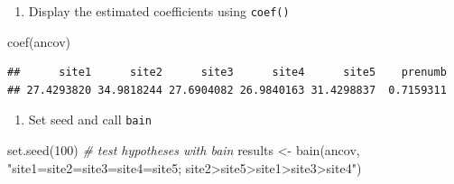 \documentclass[
]{book}
\newenvironment{Shaded}{\begin{snugshade}}{\end{snugshade}}
\newcommand{\CommentTok}[1]{\textcolor[rgb]{0.56,0.35,0.01}{\textit{#1}}}
\newcommand{\DecValTok}[1]{\textcolor[rgb]{0.00,0.00,0.81}{#1}}
\newcommand{\FunctionTok}[1]{\textcolor[rgb]{0.00,0.00,0.00}{#1}}
\newcommand{\NormalTok}[1]{#1}
\newcommand{\OtherTok}[1]{\textcolor[rgb]{0.56,0.35,0.01}{#1}}
\newcommand{\SpecialCharTok}[1]{\textcolor[rgb]{0.00,0.00,0.00}{#1}}
\newcommand{\StringTok}[1]{\textcolor[rgb]{0.31,0.60,0.02}{#1}}
\providecommand{\tightlist}{%
  \setlength{\itemsep}{0pt}\setlength{\parskip}{0pt}}
\begin{document}
\begin{Shaded}
\end{Shaded}

\begin{enumerate}
\def\labelenumi{\arabic{enumi})}
\setcounter{enumi}{1}
\tightlist
\item
  Display the estimated coefficients using \texttt{coef()}
\end{enumerate}

\begin{Shaded}
\begin{Highlighting}[]
\FunctionTok{coef}\NormalTok{(ancov)}
\end{Highlighting}
\end{Shaded}

\begin{verbatim}
##      site1      site2      site3      site4      site5    prenumb 
## 27.4293820 34.9818244 27.6904082 26.9840163 31.4298837  0.7159311
\end{verbatim}

\begin{enumerate}
\def\labelenumi{\arabic{enumi})}
\setcounter{enumi}{2}
\tightlist
\item
  Set seed and call \texttt{bain}
\end{enumerate}

\begin{Shaded}
\begin{Highlighting}[]
\FunctionTok{set.seed}\NormalTok{(}\DecValTok{100}\NormalTok{)}
\CommentTok{\# test hypotheses with bain}
\NormalTok{results }\OtherTok{\textless{}{-}} \FunctionTok{bain}\NormalTok{(ancov, }\StringTok{"site1=site2=site3=site4=site5;}
\StringTok{                        site2\textgreater{}site5\textgreater{}site1\textgreater{}site3\textgreater{}site4"}\NormalTok{)}
\end{Highlighting}
\end{Shaded}
\end{document}
